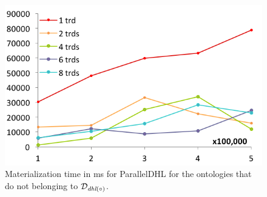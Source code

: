 \begin{figure}[htbp]
\begin{minipage}{.45\textwidth}
  \end{minipage}
  \begin{minipage}{.45\textwidth}
    \includegraphics[width=\textwidth]{experimentalResults/4-skeleton-simple}
  \end{minipage}
  \caption{Materialization time in ms for ParallelDHL for the
    ontologies that do not belonging to $\mathcal{D}_{\textit{\text{dhl}}(\circ)}$.~\label{fig:eval}}
\end{figure}

